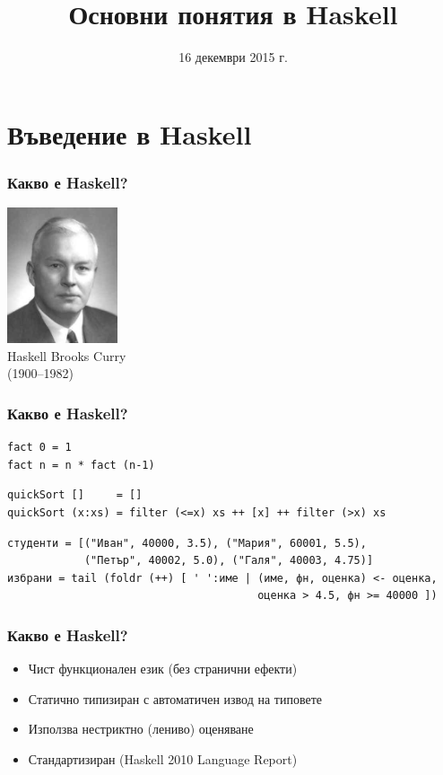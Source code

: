\documentclass{beamer}
\title{Основни понятия в Haskell}
\date{16 декември 2015 г.}
\begin{document}
\begin{frame}
  \titlepage
\end{frame}


\section{Въведение в Haskell}

\begin{frame}
  \frametitle{Какво е Haskell?}
  \pause
  \begin{center}
    \includegraphics[height=4cm]{images/HaskellBCurry.jpg}\\
    Haskell Brooks Curry\\
    (1900--1982)
  \end{center}
\end{frame}

\begin{frame}[fragile]
  \frametitle{Какво е Haskell?}
  \pause
\begin{verbatim}
fact 0 = 1
fact n = n * fact (n-1)
\end{verbatim}
  \pause
\begin{verbatim}
quickSort []     = []
quickSort (x:xs) = filter (<=x) xs ++ [x] ++ filter (>x) xs
\end{verbatim}
  \pause
\begin{verbatim}
студенти = [("Иван", 40000, 3.5), ("Мария", 60001, 5.5),
            ("Петър", 40002, 5.0), ("Галя", 40003, 4.75)]
избрани = tail (foldr (++) [ ' ':име | (име, фн, оценка) <- оценка,
                                       оценка > 4.5, фн >= 40000 ])
\end{verbatim}
\end{frame}

\begin{frame}
  \frametitle{Какво е Haskell?}
  \pause
  \begin{itemize}
  \item Чист функционален език (без странични ефекти)
  \item Статично типизиран с автоматичен извод на типовете
  \item Използва нестриктно (лениво) оценяване
  \item Стандартизиран (Haskell 2010 Language Report)
  \end{itemize}
\end{frame}
\end{document}
